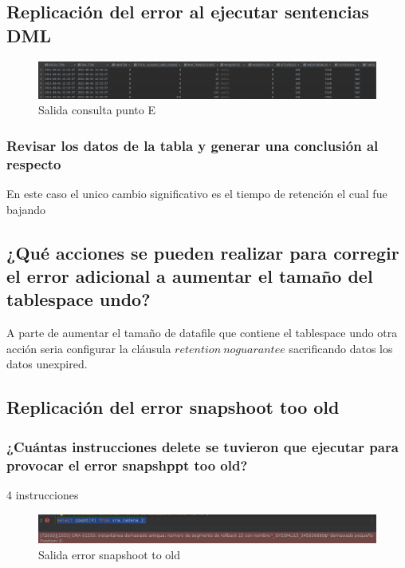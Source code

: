 \documentclass[journal]{IEEEtran}
\begin{document}
\subsection{Replicación del error al ejecutar sentencias DML}
\begin{figure}[H]
  \centering
  \includegraphics[scale=.14]{captura_6.png}
   \caption{Salida consulta punto E}
   \label{fig:validador_6}
\end{figure}
\begin{table}[H]
  \centering
  \caption{Tabla registros eliminados}
  \label{tabla:1}
\end{table}
\subsubsection{Revisar los datos de la tabla y generar una conclusión al respecto}
En este caso el unico cambio significativo es el tiempo de retención el cual fue bajando
\subsection{¿Qué acciones se pueden realizar para corregir el error adicional a aumentar el tamaño del tablespace undo?}
A parte de aumentar el tamaño de datafile que contiene el tablespace undo otra acción seria
configurar la cláusula $retention\ noguarantee$ sacrificando datos los datos unexpired.
\subsection{Replicación del error snapshoot too old}
\subsubsection{¿Cuántas instrucciones delete se tuvieron que ejecutar para provocar el error snapshppt too old?}
4 instrucciones
\begin{figure}[H]
  \centering
  \includegraphics[scale=.23]{captura_7.png}
   \caption{Salida error snapshoot to old}
   \label{fig:validador_7}
\end{figure}
\end{document}
